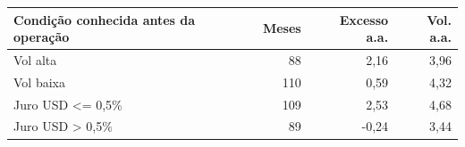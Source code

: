 \begin{tabular}{lrrr}
\toprule
Condição conhecida antes da operação & Meses & Excesso a.a. & Vol. a.a. \\
\midrule
Vol alta & 88 & 2,16 & 3,96 \\
Vol baixa & 110 & 0,59 & 4,32 \\
Juro USD <= 0,5\% & 109 & 2,53 & 4,68 \\
Juro USD > 0,5\% & 89 & -0,24 & 3,44 \\
\bottomrule
\end{tabular}